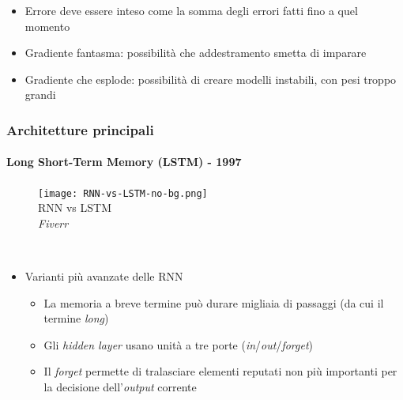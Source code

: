 \begin{frame}[t]
{\begin{minipage}[t]{\textwidth}
\begin{itemize}[leftmargin=10pt,align=right]
\begin{itemize}[leftmargin=10pt,align=right]
				\begin{itemize}[leftmargin=10pt,align=right]
					\item[\alert{\faArrowCircleRight}] Errore deve essere inteso come la somma degli errori fatti fino a quel momento
					\onslide<7->\item[\alert{\faArrowCircleRight}] \alert{Gradiente fantasma:} possibilità che addestramento smetta di imparare
					\onslide<8->\item[\alert{\faArrowCircleRight}] \alert{Gradiente che esplode:} possibilità di creare modelli instabili, con pesi troppo grandi
				\end{itemize}
			\end{itemize}
		\end{itemize}
	\end{minipage}
}
\end{frame}
%
\begin{frame}[t] \frametitle{Architetture principali}
\framesubtitle{Long Short-Term Memory (LSTM) - 1997}
{\scriptsize
\vspace*{-.5cm}
	\begin{minipage}[t]{\textwidth}
		\begin{figure}
			\centering
			\texttt{[image: RNN-vs-LSTM-no-bg.png]}
			{\tiny\\RNN vs LSTM\\\textit{\textcopyright Fiverr}}
		\end{figure}
	\end{minipage}
	\\\vspace*{.3cm}
	\begin{minipage}[t]{\textwidth}
	\begin{itemize}[leftmargin=10pt,align=right]
		\onslide<1->\item[\alert{\faArrowCircleRight}] Varianti più avanzate delle RNN
		\begin{itemize}[leftmargin=10pt,align=right]
			\item[\alert{\faArrowCircleRight}] La memoria a breve termine può durare migliaia di passaggi (da cui il termine \emph{long})
			\onslide<2->\item[\alert{\faArrowCircleRight}] Gli \emph{hidden layer} usano unità a tre porte (\emph{in}/\emph{out}/\emph{forget})
			\onslide<3->\item[\alert{\faArrowCircleRight}] Il \emph{forget} permette di tralasciare elementi reputati non più importanti per la decisione dell'\emph{output} corrente
		\end{itemize}
	\end{itemize}
	\end{minipage}
}
\end{frame}
